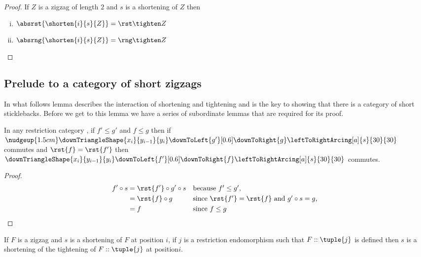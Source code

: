 \begin{lemma}
\end{lemma}
\begin{proof}
If $Z$ is a zigzag of length $2$ and $s$ is a shortening of $Z$
then
\begin{enumerate}[(i)]
\item 
$\absrst{\shorten{i}{s}{Z}} = \abrst{Z}$
\item
$\absrng{\shorten{i}{s}{Z}} = \abrng{Z}$
\end{enumerate}
\end{proof}

\subsection{Prelude to a category of short zigzags}

In what follows lemma 
describes the interaction of shortening and tightening 
and is the key to showing that there is a category of short sticklebacks. Before we get to this lemma we have a series of
subordinate lemmas that are required for its proof. 
 
\begin{lemma}
In any restriction category \catcw, 
if $f' \leq g'$ and $f \leq g$ then if  
$\nudgeup{1.5cm} %
\downTriangleShape{x_i}{y_{i-1}}{y_i}
\downToLeft{g'}[0.6]
\downToRight{g}
\leftToRightArcing[a]{s}{30}{30} 
$ commutes 
and $\rst{f}=\rst{f'}$ then
$\downTriangleShape{x_i}{y_{i-1}}{y_i}
\downToLeft{f'}[0.6]
\downToRight{f}
\leftToRightArcing[a]{s}{30}{30} 
$ commutes.
\end{lemma}
\begin{proof}
\begin{align}
f' \circ s 
   &= \rst{f'} \circ g'\circ s 
       && \mbox{because $f' \leq g'$,}\\
   &= \rst{f} \circ g 
   && \mbox{since $\rst{f'}=\rst{f}$ 
              and $g' \circ s = g$, }\\
   &= f
   &&\mbox{since $f \leq g$}
\end{align}
\end{proof}

\begin{corollary}
If $F$ is a zigzag and $s$ is a shortening of $F$ at position $i$,
if $j$ is a restriction endomorphism 
such that $F :: \tuple{j}$ is defined then
$s$ is a shortening of 
the tightening of $F :: \tuple{j}$ at position$i$.
\end{corollary}

